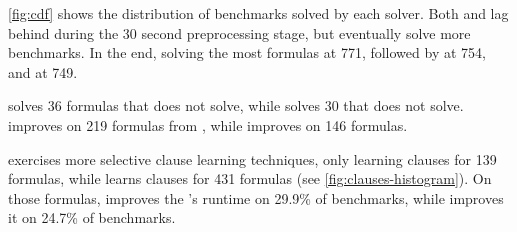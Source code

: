 \autoref{fig:cdf} shows the distribution of benchmarks solved by each solver.
Both \prelearn and \tool lag behind \cadical during the 30 second preprocessing
stage, but eventually solve more benchmarks. In the end, \prelearn solving the most
formulas at 771, followed by \tool at 754, and \cadical at 749. 

\tool solves 36 formulas that \cadical does not solve, while
\prelearn solves 30 that \cadical does not solve. \tool improves on 219 formulas
from \cadical, while \prelearn improves on 146 formulas. 


\tool exercises more selective \pr clause learning techniques, only learning \pr
clauses for 139 formulas, while \prelearn learns \pr clauses for 431 formulas
(see \autoref{fig:clauses-histogram}). On those formulas, \tool improves the
\cadical's runtime on 29.9\% of benchmarks, while \prelearn improves it on
24.7\% of benchmarks.























